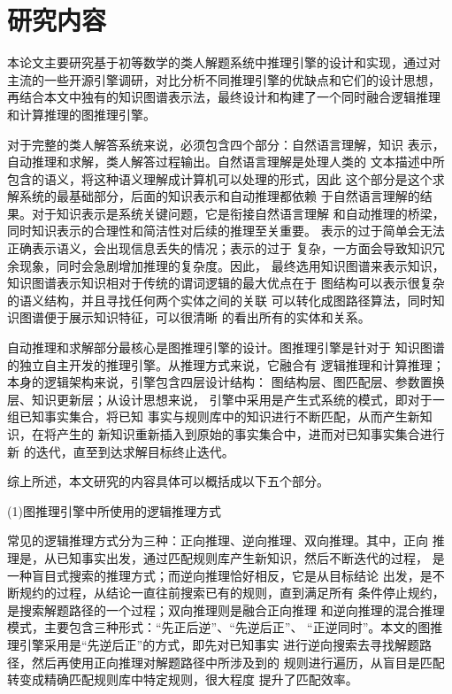 \documentclass{standalone}
\begin{document}
\section{研究内容}
本论文主要研究基于初等数学的类人解题系统中推理引擎的设计和实现，通过对
主流的一些开源引擎调研，对比分析不同推理引擎的优缺点和它们的设计思想，
再结合本文中独有的知识图谱表示法，最终设计和构建了一个同时融合逻辑推理
和计算推理的图推理引擎。

对于完整的类人解答系统来说，必须包含四个部分：自然语言理解，知识
表示，自动推理和求解，类人解答过程输出。自然语言理解是处理人类的
文本描述中所包含的语义，将这种语义理解成计算机可以处理的形式，因此
这个部分是这个求解系统的最基础部分，后面的知识表示和自动推理都依赖
于自然语言理解的结果。对于知识表示是系统关键问题，它是衔接自然语言理解
和自动推理的桥梁，同时知识表示的合理性和简洁性对后续的推理至关重要。
表示的过于简单会无法正确表示语义，会出现信息丢失的情况；表示的过于
复杂，一方面会导致知识冗余现象，同时会急剧增加推理的复杂度。因此，
最终选用知识图谱来表示知识，知识图谱表示知识相对于传统的谓词逻辑的最大优点在于
图结构可以表示很复杂的语义结构，并且寻找任何两个实体之间的关联
可以转化成图路径算法，同时知识图谱便于展示知识特征，可以很清晰
的看出所有的实体和关系。

自动推理和求解部分最核心是图推理引擎的设计。图推理引擎是针对于
知识图谱的独立自主开发的推理引擎。从推理方式来说，它融合有
逻辑推理和计算推理；本身的逻辑架构来说，引擎包含四层设计结构：
图结构层、图匹配层、参数置换层、知识更新层；从设计思想来说，
引擎中采用是产生式系统的模式，即对于一组已知事实集合，将已知
事实与规则库中的知识进行不断匹配，从而产生新知识，在将产生的
新知识重新插入到原始的事实集合中，进而对已知事实集合进行新
的迭代，直至到达求解目标终止迭代。

综上所述，本文研究的内容具体可以概括成以下五个部分。

(1)图推理引擎中所使用的逻辑推理方式

常见的逻辑推理方式分为三种：正向推理、逆向推理、双向推理。其中，正向
推理是，从已知事实出发，通过匹配规则库产生新知识，然后不断迭代的过程，
是一种盲目式搜索的推理方式；而逆向推理恰好相反，它是从目标结论
出发，是不断规约的过程，从结论一直往前搜索已有的规则，直到满足所有
条件停止规约，是搜索解题路径的一个过程；双向推理则是融合正向推理
和逆向推理的混合推理模式，主要包含三种形式：“先正后逆”、“先逆后正”、
“正逆同时”。本文的图推理引擎采用是“先逆后正”的方式，即先对已知事实
进行逆向搜索去寻找解题路径，然后再使用正向推理对解题路径中所涉及到的
规则进行遍历，从盲目是匹配转变成精确匹配规则库中特定规则，很大程度
提升了匹配效率。
\end{document}
